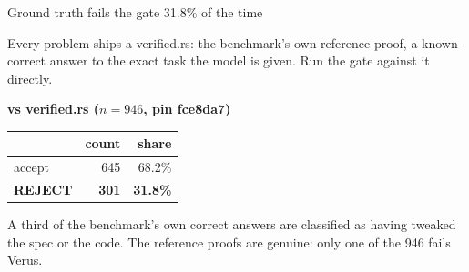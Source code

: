 \documentclass[aspectratio=169,10pt]{beamer}
\newcommand{\code}[1]{{\ttfamily #1}}
\newcommand{\hd}[1]{\textbf{\color{lgTeal}#1}}
\newcommand{\good}[1]{{\color{lgGreen}#1}}
\newcommand{\bad}[1]{{\color{lgRed}#1}}
\begin{document}
\begin{frame}{Ground truth fails the gate 31.8\% of the time}

{\scriptsize
Every problem ships a \code{verified.rs}: the benchmark's own reference proof, a
known-correct answer to the exact task the model is given. Run the gate against it directly.
}

\vspace{10pt}
\begin{center}
{\scriptsize
\hd{\code{lynette compare -t}\quad\code{code\_spec.rs} vs \code{verified.rs}\quad
($n=946$, pin \code{fce8da7})}\\[6pt]
\begin{tabular}{lrr}
\toprule
 & \textbf{count} & \textbf{share} \\
\midrule
\good{accept}         & 645 & 68.2\% \\
\bad{\textbf{REJECT}} & \bad{\textbf{301}} & \bad{\textbf{31.8\%}} \\
\bottomrule
\end{tabular}
}
\end{center}

\vspace{12pt}
\begin{callout}[lgAccent]
\scriptsize
A third of the benchmark's own correct answers are classified as having tweaked the spec or
the code. The reference proofs are genuine: only one of the 946 fails Verus.
\end{callout}

\end{frame}
\end{document}
